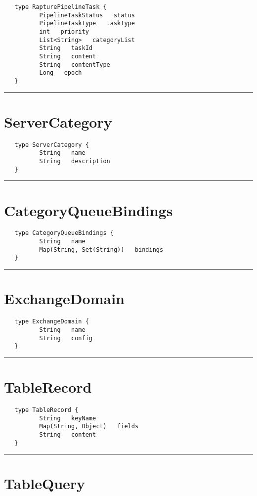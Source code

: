 \begin{verbatim}
   type RapturePipelineTask {
          PipelineTaskStatus   status
          PipelineTaskType   taskType
          int   priority
          List<String>   categoryList
          String   taskId
          String   content
          String   contentType
          Long   epoch
   }
\end{verbatim}

\rule{15cm}{2pt}
\section{ServerCategory}
\label{type:ServerCategory}

\begin{verbatim}
   type ServerCategory {
          String   name
          String   description
   }
\end{verbatim}

\rule{15cm}{2pt}
\section{CategoryQueueBindings}
\label{type:CategoryQueueBindings}

\begin{verbatim}
   type CategoryQueueBindings {
          String   name
          Map(String, Set(String))   bindings
   }
\end{verbatim}

\rule{15cm}{2pt}
\section{ExchangeDomain}
\label{type:ExchangeDomain}

\begin{verbatim}
   type ExchangeDomain {
          String   name
          String   config
   }
\end{verbatim}

\rule{15cm}{2pt}
\section{TableRecord}
\label{type:TableRecord}

\begin{verbatim}
   type TableRecord {
          String   keyName
          Map(String, Object)   fields
          String   content
   }
\end{verbatim}

\rule{15cm}{2pt}
\section{TableQuery}
\label{type:TableQuery}

